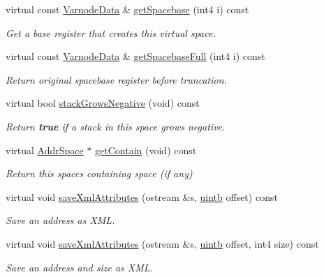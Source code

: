 \begin{DoxyCompactItemize}
virtual const \mbox{\hyperlink{struct_varnode_data}{Varnode\+Data}} \& \mbox{\hyperlink{class_addr_space_ad6b5eb815514577118d9b998447cc4d0}{get\+Spacebase}} (int4 i) const
\begin{DoxyCompactList}\small\item\em Get a base register that creates this virtual space. \end{DoxyCompactList}\item 
virtual const \mbox{\hyperlink{struct_varnode_data}{Varnode\+Data}} \& \mbox{\hyperlink{class_addr_space_a8fb25cf630f64ad73a137393b48067a0}{get\+Spacebase\+Full}} (int4 i) const
\begin{DoxyCompactList}\small\item\em Return original spacebase register before truncation. \end{DoxyCompactList}\item 
virtual bool \mbox{\hyperlink{class_addr_space_a9468b2d0bc4cdaa762e213fb395ac434}{stack\+Grows\+Negative}} (void) const
\begin{DoxyCompactList}\small\item\em Return {\bfseries{true}} if a stack in this space grows negative. \end{DoxyCompactList}\item 
virtual \mbox{\hyperlink{class_addr_space}{Addr\+Space}} $\ast$ \mbox{\hyperlink{class_addr_space_a616f457a28ab5779167183f47a5707b8}{get\+Contain}} (void) const
\begin{DoxyCompactList}\small\item\em Return this space\textquotesingle{}s containing space (if any) \end{DoxyCompactList}\item 
virtual void \mbox{\hyperlink{class_addr_space_a4475d64c56141adf80cb0aca5b23e3c6}{save\+Xml\+Attributes}} (ostream \&s, \mbox{\hyperlink{types_8h_a2db313c5d32a12b01d26ac9b3bca178f}{uintb}} offset) const
\begin{DoxyCompactList}\small\item\em Save an address as X\+ML. \end{DoxyCompactList}\item 
virtual void \mbox{\hyperlink{class_addr_space_a67510a8345fcc17157cc0389e757d504}{save\+Xml\+Attributes}} (ostream \&s, \mbox{\hyperlink{types_8h_a2db313c5d32a12b01d26ac9b3bca178f}{uintb}} offset, int4 size) const
\begin{DoxyCompactList}\small\item\em Save an address and size as X\+ML. \end{DoxyCompactList}\item 

\end{DoxyCompactItemize}
